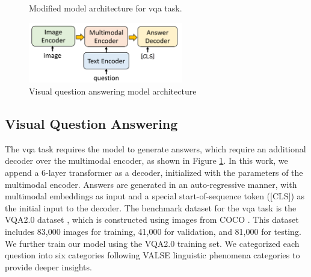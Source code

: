 \begin{figure}[h]
    \caption{Visual question answering model architecture}
    \label{fig:vqa}
    Modified model architecture for \acrshort{vqa} task.
    \begin{center}
        \includegraphics[width=0.6\textwidth]{Images/vqa_method.png}
    \end{center}
    \small
\end{figure}

\subsection{Visual Question Answering}
The \acrfull{vqa} task requires the model to generate answers, which require an additional decoder over the multimodal encoder, as shown in Figure \ref{fig:vqa}. 
In this work, we append a 6-layer transformer as a decoder, initialized with the parameters of the multimodal encoder. 
Answers are generated in an auto-regressive manner, with multimodal embeddings as input and a special start-of-sequence token ([CLS]) as the initial input to the decoder.
The benchmark dataset for the \acrshort{vqa} task is the VQA2.0 dataset \cite{vqa2}, which is constructed using images from COCO \cite{mscoco}. 
This dataset includes 83,000 images for training, 41,000 for validation, and 81,000 for testing.
We further train our model using the VQA2.0 training set.
We categorized each question into six categories following VALSE linguistic phenomena categories to provide deeper insights.

